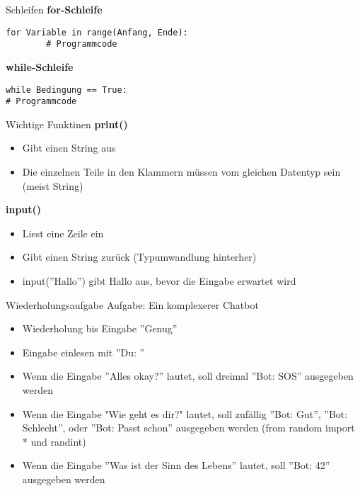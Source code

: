 \begin{frame}[fragile]{Schleifen}
\textbf{for-Schleife}
\begin{lstlisting}
for Variable in range(Anfang, Ende):
		# Programmcode
\end{lstlisting}

\textbf{while-Schleife}
\begin{lstlisting}
while Bedingung == True:
# Programmcode
\end{lstlisting}
\end{frame}

\begin{frame}[fragile]{Wichtige Funktinen}
\textbf{print()}
\begin{itemize}
	\item Gibt einen String aus
	\item Die einzelnen Teile in den Klammern müssen vom gleichen Datentyp sein (meist String)
\end{itemize}

\textbf{input()}
\begin{itemize}
	\item Liest eine Zeile ein
	\item Gibt einen String zurück (Typumwandlung hinterher)
	\item input(''Hallo'') gibt Hallo aus, bevor die Eingabe erwartet wird
\end{itemize}
\end{frame}


\begin{frame}[fragile]{Wiederholungsaufgabe}
	Aufgabe: Ein komplexerer Chatbot\\
	\begin{itemize}
		\item Wiederholung bis Eingabe ''Genug''
		\item Eingabe einlesen mit ''Du: ''
		\item Wenn die Eingabe ''Alles okay?'' lautet, soll dreimal ''Bot: SOS'' ausgegeben werden
		\item Wenn die Eingabe "Wie geht es dir?" lautet, soll zufällig ''Bot: Gut'', ''Bot: Schlecht'', oder ''Bot: Passt schon'' ausgegeben werden (from random import *  und randint)
		\item Wenn die Eingabe ''Was ist der Sinn des Lebens'' lautet, soll ''Bot: 42'' ausgegeben werden
	\end{itemize}
	
\end{frame}

